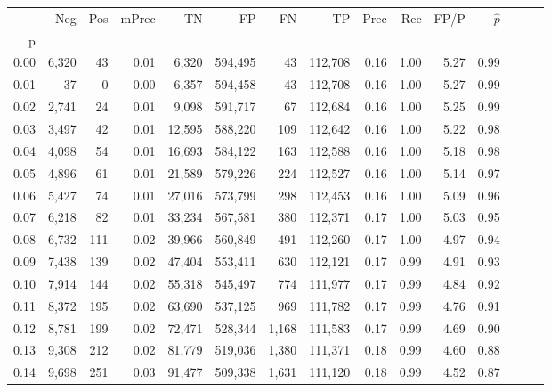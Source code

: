 \begin{tabular}{rrrrrrrrrrrrrrr}
\toprule
{} &     Neg &    Pos & mPrec &       TN &       FP &       FN &       TP &  Prec &   Rec &  FP/P & $\hat{p}$ \\
p    &         &        &       &          &          &          &          &       &       &       &           \\
\midrule
0.00 &   6,320 &     43 &  0.01 &    6,320 &  594,495 &       43 &  112,708 &  0.16 &  1.00 &  5.27 &      0.99 \\
0.01 &      37 &      0 &  0.00 &    6,357 &  594,458 &       43 &  112,708 &  0.16 &  1.00 &  5.27 &      0.99 \\
0.02 &   2,741 &     24 &  0.01 &    9,098 &  591,717 &       67 &  112,684 &  0.16 &  1.00 &  5.25 &      0.99 \\
0.03 &   3,497 &     42 &  0.01 &   12,595 &  588,220 &      109 &  112,642 &  0.16 &  1.00 &  5.22 &      0.98 \\
0.04 &   4,098 &     54 &  0.01 &   16,693 &  584,122 &      163 &  112,588 &  0.16 &  1.00 &  5.18 &      0.98 \\
0.05 &   4,896 &     61 &  0.01 &   21,589 &  579,226 &      224 &  112,527 &  0.16 &  1.00 &  5.14 &      0.97 \\
0.06 &   5,427 &     74 &  0.01 &   27,016 &  573,799 &      298 &  112,453 &  0.16 &  1.00 &  5.09 &      0.96 \\
0.07 &   6,218 &     82 &  0.01 &   33,234 &  567,581 &      380 &  112,371 &  0.17 &  1.00 &  5.03 &      0.95 \\
0.08 &   6,732 &    111 &  0.02 &   39,966 &  560,849 &      491 &  112,260 &  0.17 &  1.00 &  4.97 &      0.94 \\
0.09 &   7,438 &    139 &  0.02 &   47,404 &  553,411 &      630 &  112,121 &  0.17 &  0.99 &  4.91 &      0.93 \\
0.10 &   7,914 &    144 &  0.02 &   55,318 &  545,497 &      774 &  111,977 &  0.17 &  0.99 &  4.84 &      0.92 \\
0.11 &   8,372 &    195 &  0.02 &   63,690 &  537,125 &      969 &  111,782 &  0.17 &  0.99 &  4.76 &      0.91 \\
0.12 &   8,781 &    199 &  0.02 &   72,471 &  528,344 &    1,168 &  111,583 &  0.17 &  0.99 &  4.69 &      0.90 \\
0.13 &   9,308 &    212 &  0.02 &   81,779 &  519,036 &    1,380 &  111,371 &  0.18 &  0.99 &  4.60 &      0.88 \\
0.14 &   9,698 &    251 &  0.03 &   91,477 &  509,338 &    1,631 &  111,120 &  0.18 &  0.99 &  4.52 &      0.87 \\

\end{tabular}
